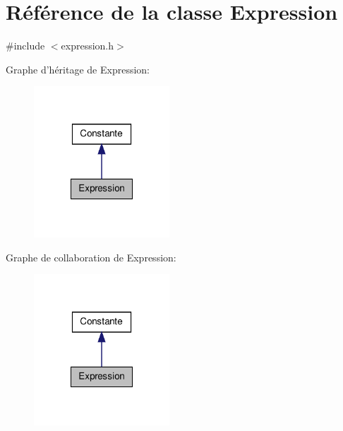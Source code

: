 \hypertarget{class_expression}{\section{\-Référence de la classe \-Expression}
\label{class_expression}
}


{\ttfamily \#include $<$expression.\-h$>$}



\-Graphe d'héritage de \-Expression\-:\nopagebreak
\begin{figure}[H]
\begin{center}
\leavevmode
\includegraphics[width=144pt]{class_expression__inherit__graph}
\end{center}
\end{figure}


\-Graphe de collaboration de \-Expression\-:\nopagebreak
\begin{figure}[H]
\begin{center}
\leavevmode
\includegraphics[width=144pt]{class_expression__coll__graph}
\end{center}
\end{figure}
